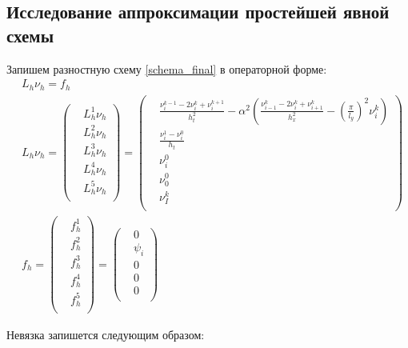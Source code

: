 {	\subsection{Исследование аппроксимации простейшей явной схемы}{
		Запишем разностную схему \eqref{schema_final} в операторной форме:
		\begin{equation}\label{operator_form}
			\begin{split}
			& L_h\nu_h = f_h \\
			& L_h\nu_h = 
			\left(\begin{split}
				& L^1_h\nu_h \\
				& L^2_h\nu_h \\ 
				& L^3_h\nu_h \\ 
				& L^4_h\nu_h \\ 
				& L^5_h\nu_h \\ 
				\end{split}
			\right) 
			=
			\left(\begin{split}
				&\frac{\nu^{k-1}_i - 2\nu^{k}_i + \nu^{k+1}_i}{h_t^2} - \alpha^2\left(\frac{\nu^{k}_{i-1} - 2\nu^{k}_i + \nu^{k}_{i+1}}{h_x^2} - \left(\frac{\pi}{l_y}\right)^2 \nu^{k}_i\right)\\
				& \frac{\nu^1_i - \nu^0_i}{h_t} \\ 
				& \nu^0_i \\
				& \nu^0_0 \\
				& \nu^k_I \\
				\end{split}
			\right) \\
			& f_h = 
			\left(\begin{split}
				& f^1_h \\
				& f^2_h \\
				& f^3_h \\
				& f^4_h \\
				& f^5_h \\
				\end{split}
			\right) 
			=
			\left(\begin{split}
				& 0 \\
				& \psi_i \\
				& 0 \\
				& 0 \\
				& 0 \\
				\end{split}
			\right) 
			\end{split}
		\end{equation}
		
		Невязка запишется следующим образом:
		
}}
